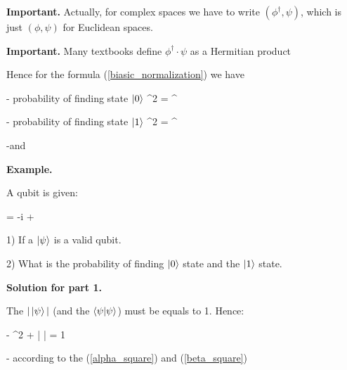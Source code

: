 \documentclass{article}
\begin{document}
\textbf{Important.} Actually, for complex spaces we have to write $(\phi^{\dag},\psi)$, which is just $(\phi,\psi)$ for Euclidean spaces.

\textbf{Important.} Many textbooks define $\phi^{\dag} \cdot \psi$ as a Hermitian product

Hence for the formula (\ref{biasic_normalization}) we have

- probability of finding state $\ket{0}$
\beq \label{alpha_square}
\vert \alpha \vert^2 = \alpha^{\dag} \cdot \alpha
\eeq


- probability of finding state $\ket{1}$
\beq \label{beta_square}
\vert \beta \vert^2 = \beta^{\dag} \cdot \beta
\eeq

-and


\textbf{Example.}

A qubit is given:

\beqn
\ket{\psi} = -i + 
\eeq


1) If a $\ket{\psi}$ is a valid qubit.

2) What is the probability of finding $\ket{0}$ state and the $\ket{1}$ state.

\textbf{Solution for part 1.}

The $\vert \ket{\psi} \vert$ (and the $\bra{\psi}\ket{\psi}$) must be equals to 1. Hence:

\beqn
\vert - \vert^{2} + \left|  \right| = 1
\eeq

- according to the (\ref{alpha_square}) and (\ref{beta_square})
\end{document}
